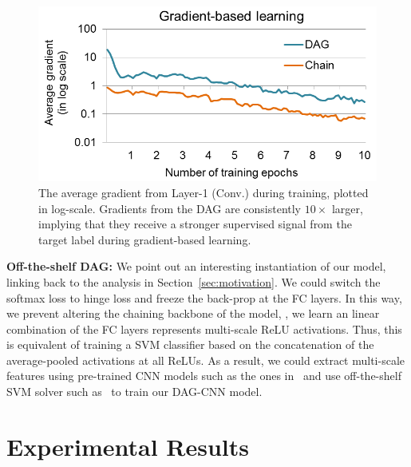 \documentclass[10pt,twocolumn,letterpaper]{article}
\begin{document}
\begin{figure}[htbp]
\centering
\includegraphics[width=.9\columnwidth]{fig/fig_grad.png}
\caption{The average gradient from Layer-1 (Conv.) during training, plotted in log-scale. Gradients from the DAG are consistently $10\times$ larger, implying that they receive a stronger supervised signal from the target label during gradient-based learning.}
\label{fig:grad}
\end{figure}


{\bf Off-the-shelf DAG:} We point out an interesting instantiation of our model, linking back to the analysis in Section~\ref{sec:motivation}. We could switch the softmax loss to hinge loss and freeze the back-prop at the FC layers. In this way, we prevent altering the chaining backbone of the model, \ie, we learn an linear combination of the FC layers represents multi-scale ReLU activations. Thus, this is equivalent of training a SVM classifier based on the concatenation of the average-pooled activations at all ReLUs. As a result, we could extract multi-scale features using pre-trained CNN models such as the ones in~\cite{AlexNet, veryDeep} and use off-the-shelf SVM solver such as~\cite{liblinear} to train our DAG-CNN model.

\section{Experimental Results\label{sec:exp}}
\end{document}
